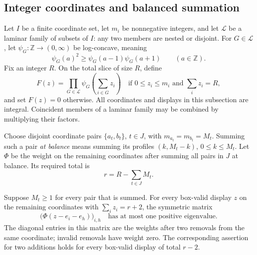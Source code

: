 \subsection{Integer coordinates and balanced summation}

Let \(I\) be a finite coordinate set, let \(m_i\) be nonnegative
integers, and let \(\mathcal L\) be a laminar family of subsets of \(I\):
any two members are nested or disjoint.
For \(G\in\mathcal L\), let
\(\psi_G:\mathbb Z\longrightarrow(0,\infty)\) be log-concave, meaning
\[
 \psi_G(a)^2\ge \psi_G(a-1)\psi_G(a+1)
 \qquad(a\in\mathbb Z).
\]
Fix an integer \(R\).  On the total slice of size \(R\), define
\begin{equation}
 F(z)=
 \prod_{G\in\mathcal L}
 \psi_G\left(\sum_{i\in G}z_i\right)
 \quad\text{if }0\le z_i\le m_i\text{ and }\sum_i z_i=R,
 \label{eq:laminar-weight}
\end{equation}
and set \(F(z)=0\) otherwise.
All coordinates and displays in this subsection are integral.
Coincident members of a laminar family may be combined by multiplying
their factors.

Choose disjoint coordinate pairs
\(\{a_t,b_t\}\), \(t\in J\), with
\(m_{a_t}=m_{b_t}=M_t\).
Summing such a pair \emph{at balance} means summing its profiles
\((k,M_t-k)\), \(0\le k\le M_t\).
Let \(\Phi\) be the weight on the remaining coordinates after summing
all pairs in \(J\) at balance.
Its required total is
\[
 r=R-\sum_{t\in J}M_t.
\]

\begin{lemma}
\label{lem:integer-signature}
Suppose \(M_t\ge1\) for every pair that is summed.
For every box-valid display \(z\) on the remaining coordinates with
\(\sum_i z_i=r+2\), the symmetric matrix
\begin{equation}
 \bigl(\Phi(z-e_i-e_h)\bigr)_{i,h}
 \quad\text{has at most one positive eigenvalue}.
 \label{eq:integer-removal-signature}
\end{equation}
The diagonal entries in this matrix are the weights after two
removals from the same coordinate; invalid removals have weight zero.
The corresponding assertion for two additions holds for every
box-valid display of total \(r-2\).
\end{lemma}

